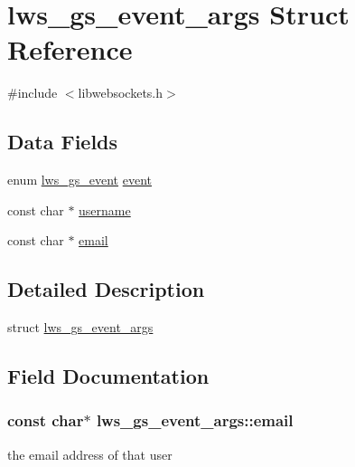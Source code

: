 \hypertarget{structlws__gs__event__args}{}\section{lws\+\_\+gs\+\_\+event\+\_\+args Struct Reference}
\label{structlws__gs__event__args}


{\ttfamily \#include $<$libwebsockets.\+h$>$}

\subsection*{Data Fields}
\begin{DoxyCompactItemize}
\item 
enum \hyperlink{group__generic-sessions_gaa93946b3d921072209d5cd8cdfa5332e}{lws\+\_\+gs\+\_\+event} \hyperlink{structlws__gs__event__args_a477274f8ca22ba7411b9285b9dc8dd06}{event}
\item 
const char $\ast$ \hyperlink{structlws__gs__event__args_a2bec693d8a43730d487004a44326178b}{username}
\item 
const char $\ast$ \hyperlink{structlws__gs__event__args_acd17e4f9f91f7f9a8f0fbf0744a3a463}{email}
\end{DoxyCompactItemize}


\subsection{Detailed Description}
struct \hyperlink{structlws__gs__event__args}{lws\+\_\+gs\+\_\+event\+\_\+args} 

\subsection{Field Documentation}
\subsubsection[{\texorpdfstring{email}{email}}]{\setlength{\rightskip}{0pt plus 5cm}const char$\ast$ lws\+\_\+gs\+\_\+event\+\_\+args\+::email}\hypertarget{structlws__gs__event__args_acd17e4f9f91f7f9a8f0fbf0744a3a463}{}\label{structlws__gs__event__args_acd17e4f9f91f7f9a8f0fbf0744a3a463}
the email address of that user 
